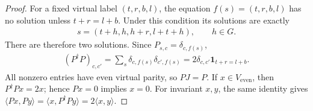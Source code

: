 \begin{proof}\leanok
    For a fixed virtual label $(t,r,b,l)$, the equation
    $f(s)=(t,r,b,l)$ has no solution unless $t+r=l+b$.
    Under this condition its solutions are exactly
    \begin{align}
        s=(t+h,h,h+r,l+t+h),\qquad h\in G.
    \end{align}
    There are therefore two solutions. Since $P_{s,c}=\delta_{c,f(s)}$,
    \begin{align}
        (P^\dagger P)_{c,c'}
        =\sum_s\delta_{c,f(s)}\delta_{c',f(s)}
        =2\delta_{c,c'}\mathbf1_{t+r=l+b}.
    \end{align}
    All nonzero entries have even virtual parity, so $PJ=P$.
    If $x\in V_{\mathrm{even}}$, then $P^\dagger Px=2x$;
    hence $Px=0$ implies $x=0$. For invariant $x,y$, the same identity gives
    $\langle Px,Py\rangle=\langle x,P^\dagger Py\rangle
        =2\langle x,y\rangle$.
\end{proof}
